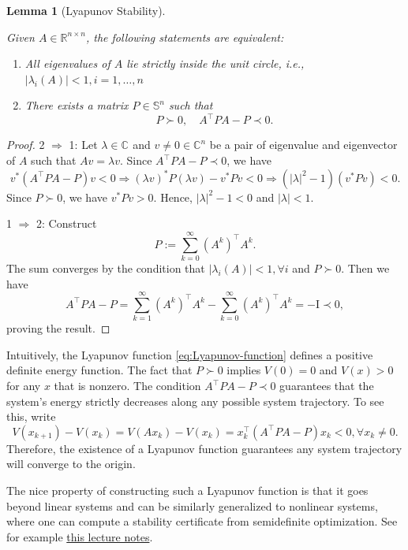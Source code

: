 \documentclass[
]{book}
\newtheorem{lemma}{Lemma}[chapter]
\theoremstyle{definition}
\theoremstyle{definition}
\theoremstyle{definition}
\theoremstyle{definition}
\theoremstyle{remark}
\begin{document}
\begin{lemma}[Lyapunov Stability]
\protect\hypertarget{lem:LyapunovStability}{}\label{lem:LyapunovStability}

Given \(A \in \mathbb{R}^{n \times n}\), the following statements are equivalent:

\begin{enumerate}
\def\labelenumi{\arabic{enumi}.}
\item
  All eigenvalues of \(A\) lie strictly inside the unit circle, i.e., \(|\lambda_i(A)| < 1, i=1,\dots,n\)
\item
  There exists a matrix \(P \in \mathbb{S}^{n}\) such that
  \[
  P \succ 0, \quad A^\top P A - P \prec 0.
  \]
\end{enumerate}

\end{lemma}

\begin{proof}
2 \(\Rightarrow\) 1: Let \(\lambda \in \mathbb{C}^{}\) and \(v \neq 0 \in \mathbb{C}^{n}\) be a pair of eigenvalue and eigenvector of \(A\) such that \(A v = \lambda v\). Since \(A^\top P A - P \prec 0\), we have
\[
v^* (A^\top P A - P) v < 0 \Rightarrow (\lambda v)^* P (\lambda v) - v^* P v < 0 \Rightarrow (|\lambda|^2 - 1) (v^* P v) < 0.
\]
Since \(P \succ 0\), we have \(v^* P v > 0\). Hence, \(|\lambda|^2 - 1 < 0\) and \(|\lambda| < 1\).

1 \(\Rightarrow\) 2: Construct
\[
P := \sum_{k=0}^{\infty} (A^k)^\top A^k.
\]
The sum converges by the condition that \(|\lambda_i(A)| < 1,\forall i\) and \(P \succ 0\). Then we have
\[
A^\top P A - P = \sum_{k=1}^{\infty} (A^k)^\top A^k - \sum_{k=0}^{\infty} (A^k)^\top A^k = - \mathrm{I}\prec 0,
\]
proving the result.
\end{proof}

Intuitively, the Lyapunov function \eqref{eq:Lyapunov-function} defines a positive definite energy function. The fact that \(P \succ 0\) implies \(V(0) = 0\) and \(V(x) > 0\) for any \(x\) that is nonzero. The condition \(A^\top P A - P \prec 0\) guarantees that the system's energy strictly decreases along any possible system trajectory. To see this, write
\[
V(x_{k+1}) - V(x_k) = V(Ax_k) - V(x_k) = x_k^\top(A^\top P A - P) x_k < 0, \forall x_k \neq 0.
\]
Therefore, the existence of a Lyapunov function guarantees any system trajectory will converge to the origin.

The nice property of constructing such a Lyapunov function is that it goes beyond linear systems and can be similarly generalized to nonlinear systems, where one can compute a stability certificate from semidefinite optimization. See for example \href{https://hankyang.seas.harvard.edu/OptimalControlEstimation/stability.html\#lyapunov-analysis}{this lecture notes}.
\end{document}
